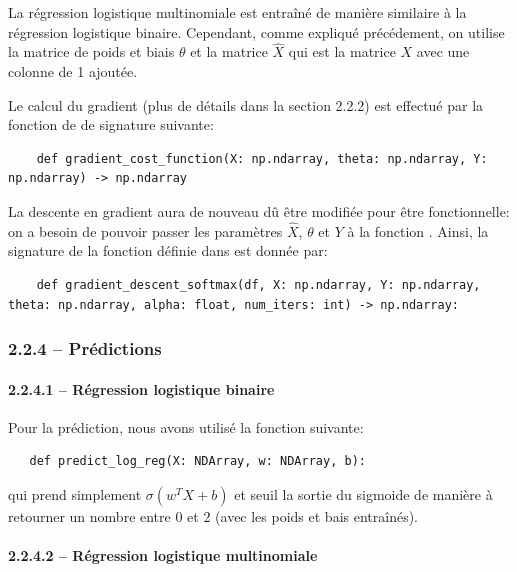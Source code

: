 \documentclass[
]{article}
\begin{document}
La régression logistique multinomiale est entraîné de manière similaire
à la régression logistique binaire. Cependant, comme expliqué
précédement, on utilise la matrice de poids et biais \(\theta\) et la
matrice \(\hat{X}\) qui est la matrice \(X\) avec une colonne de 1
ajoutée.

Le calcul du gradient (plus de détails dans la section 2.2.2) est
effectué par la fonction  de
 de signature suivante:

\begin{lstlisting}
    def gradient_cost_function(X: np.ndarray, theta: np.ndarray, Y: np.ndarray) -> np.ndarray
\end{lstlisting}

La descente en gradient aura de nouveau dû être modifiée pour être
fonctionnelle: on a besoin de pouvoir passer les paramètres \(\hat{X}\),
\(\theta\) et \(Y\) à la fonction .
Ainsi, la signature de la fonction 
définie dans  est donnée par:

\begin{lstlisting}
    def gradient_descent_softmax(df, X: np.ndarray, Y: np.ndarray, theta: np.ndarray, alpha: float, num_iters: int) -> np.ndarray:
\end{lstlisting}

\hypertarget{pruxe9dictions}{%
\subsubsection{2.2.4 -- Prédictions}\label{pruxe9dictions}}

\hypertarget{ruxe9gression-logistique-binaire}{%
\paragraph{2.2.4.1 -- Régression logistique
binaire}\label{ruxe9gression-logistique-binaire}}

Pour la prédiction, nous avons utilisé la fonction suivante:

\begin{lstlisting}
   def predict_log_reg(X: NDArray, w: NDArray, b):
\end{lstlisting}

qui prend simplement \(\sigma(w^T X + b)\) et seuil la sortie du
sigmoide de manière à retourner un nombre entre 0 et 2 (avec les poids
et bais entraînés).

\hypertarget{ruxe9gression-logistique-multinomiale}{%
\paragraph{2.2.4.2 -- Régression logistique
multinomiale}\label{ruxe9gression-logistique-multinomiale}}
\end{document}
